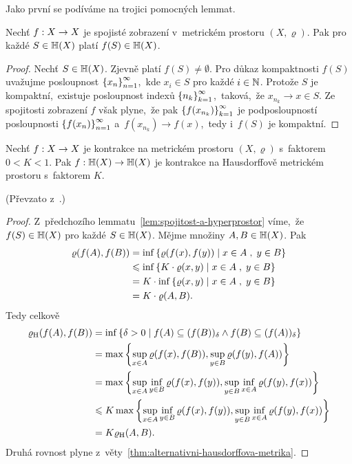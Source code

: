 Jako první se podíváme na trojici pomocných lemmat.
\begin{lemma}\label{lem:spojitost-a-hyperprostor}
    Nechť $f:X \rightarrow X$ je spojisté zobrazení v~metrickém prostoru $(X,\varrho)$. Pak pro každé $S\in\mathbb{H}(X)$ platí $f(S)\in\mathbb{H}(X)$.
\end{lemma}
\begin{proof}
    Nechť $S\in\mathbb{H}(X)$. Zjevně platí $f(S)\neq\emptyset$. Pro důkaz kompaktnosti $f(S)$ uvažujme posloupnost $\left\{x_n\right\}_{n=1}^\infty$,~kde $x_i\in S$ pro každé $i\in\mathbb{N}$. Protože $S$ je kompaktní,~existuje posloupnost indexů $\left\{n_k\right\}_{k=1}^\infty$,~taková,~že $x_{n_k}\to x\in S$. Ze spojitosti zobrazení $f$ však plyne,~že pak $\left\{f(x_{n_k})\right\}_{k=1}^\infty$ je podposloupností posloupnosti $\left\{f(x_n)\right\}_{n=1}^\infty$ a~$f(x_{n_k})\to f(x)$,~tedy i~$f(S)$ je kompaktní.
\end{proof}
\begin{lemma}\label{lem:kontrakce-a-hyperprostor}
    Nechť $f:X \rightarrow X$ je kontrakce na metrickém prostoru $(X,\varrho)$ s~faktorem $0<K<1$. Pak $f:\mathbb{H}(X) \rightarrow \mathbb{H}(X)$ je kontrakce na Hausdorffově metrickém prostoru s~faktorem $K$.
\end{lemma}
(Převzato z~\citep[str. 79]{Barnsley1993}.)
\begin{proof}
    Z~předchozího lemmatu~\ref{lem:spojitost-a-hyperprostor} víme,~že $f(S)\in\mathbb{H}(X)$ pro každé $S\in\mathbb{H}(X)$. Mějme množiny $A,B\in\mathbb{H}(X)$. Pak
    \begin{align*}
        \varrho(f(A),f(B))&=\inf\left\{\varrho(f(x),f(y))\mid x\in A\;,\;y\in B\right\}\\
        &\leqslant\inf\left\{K\cdot\varrho(x,y)\mid x\in A\;,\;y\in B\right\}\\
        &=K\cdot\inf\left\{\varrho(x,y)\mid x\in A\;,\;y\in B\right\}\\
        &=K\cdot\varrho(A,B).
    \end{align*}
    Tedy celkově
    \begin{align*}
        \varrho_\textup{H}(f(A),f(B))&=\inf\left\{\delta>0\mid f(A)\subseteq(f(B))_\delta\land f(B)\subseteq(f(A))_\delta\right\}\\
        &=\max\left\{\sup_{x\in A}\varrho(f(x),f(B)),\sup_{y\in B}\varrho(f(y),f(A))\right\}\\
        &=\max\left\{\sup_{x\in A}\inf_{y\in B}\varrho(f(x),f(y)),\sup_{y\in B}\inf_{x\in A}\varrho(f(y),f(x))\right\}\\
        &\leqslant K\max\left\{\sup_{x\in A}\inf_{y\in B}\varrho(f(x),f(y)),\sup_{y\in B}\inf_{x\in A}\varrho(f(y),f(x))\right\}\\
        &=K\varrho_\textup{H}(A,B).
    \end{align*}
    Druhá rovnost plyne z~věty~\ref{thm:alternativni-hausdorffova-metrika}.
\end{proof}
